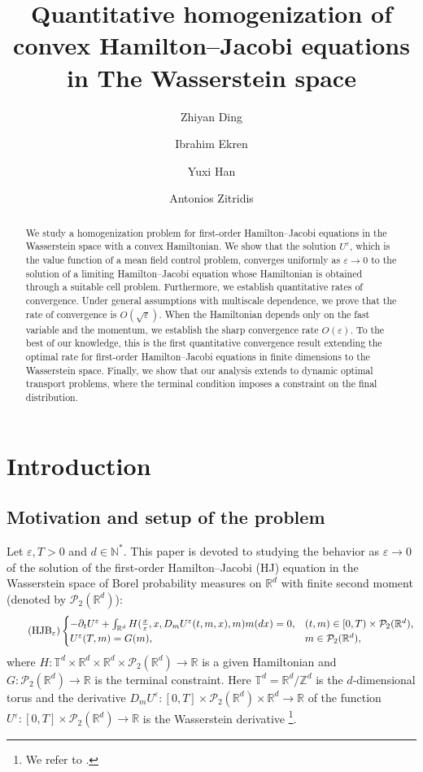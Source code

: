 \documentclass[reqno,11pt]{amsart}
\title[Homogenization of HJ equations in the Wasserstein space]{Quantitative homogenization of convex Hamilton--Jacobi equations in The Wasserstein space}
\author[Z.\ Ding]{Zhiyan Ding}
\author[I.\ Ekren]{Ibrahim Ekren}
\author[Y. Han]{Yuxi Han}
\author[A.\ Zitridis]{Antonios Zitridis}
\numberwithin{equation}{section}
\newcommand{\be}{\begin{equation}}
\newcommand{\ee}{\end{equation}}
\newcommand{\R}{\mathbb{R}} %
\newcommand{\e}{\varepsilon}
\newcommand{\T}{\mathbb{T}}
\begin{document}
\null
\vspace{-4mm}
    \maketitle

\vspace{-10mm}
\begin{abstract}
We study a homogenization problem for first-order Hamilton--Jacobi equations in the Wasserstein space with a convex Hamiltonian. We show that the solution $U^\e$, which is the value function of a mean field control problem, converges uniformly as $\e \to 0$ to the solution of a limiting Hamilton--Jacobi equation whose Hamiltonian is obtained through a suitable cell problem. Furthermore, we establish quantitative rates of convergence. Under general assumptions with multiscale dependence, we prove that the rate of convergence is $O(\sqrt{\e})$.  When the Hamiltonian depends only on the fast variable and the momentum, we establish the sharp convergence rate $O(\e)$. To the best of our knowledge,
this is the first quantitative convergence result extending the optimal rate for first-order Hamilton--Jacobi equations in finite dimensions to the Wasserstein space.
Finally, we show that our analysis extends to dynamic optimal transport problems, where the terminal condition imposes a constraint on the final distribution.
\end{abstract}


\tableofcontents

    \section{Introduction}
    \subsection{Motivation and setup of the problem}
    Let $\e,T>0$ and $d\in \mathbb{N}^*$. This paper is devoted to studying the behavior as $\e\to 0$ of the solution
    of the first-order Hamilton--Jacobi (HJ) equation in the Wasserstein space of Borel probability measures on $\R^d$ with finite second moment (denoted by $\mathcal{P}_2(\R^d)$):
    \be\label{HJBe}\tag{$\mathrm{HJB}_\e$}
    \begin{cases}
        -\partial_tU^\e +\int_{\R^d}H(\frac{x}{\e},x,D_mU^\e(t,m,x),m)m(dx)=0, &(t,m)\in [0,T)\times \mathcal{P}_2(\R^d),\\
        U^\e(T,m)= G(m), & m\in\mathcal{P}_2(\R^d),
    \end{cases}
    \ee
    where $H\colon \T^d\times \R^d\times \R^d\times\mathcal{P}_2(\R^d)\to \R$ is a given Hamiltonian and $G\colon \mathcal{P}_2(\R^d)\to \R$ is the terminal constraint. Here $\T^d=\R^d/\mathbb{Z}^d$ is the $d$-dimensional torus and the derivative
    $D_mU^\e\colon[0,T]\times\mathcal{P}_2(\R^d)\times \R^d\to \R$ of the function $U^\e\colon [0,T]\times\mathcal{P}_2(\R^d)\to \R$ is the Wasserstein derivative \footnote{We refer to \cite[Section 5]{carmona2018probabilistic}.}.
    \vspace{2mm}
\end{document}
